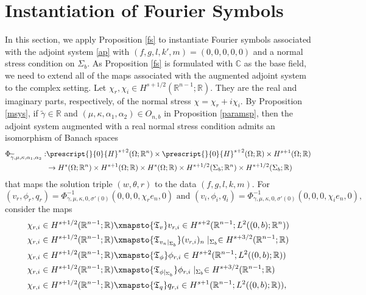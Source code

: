 \documentclass[11pt,letterpaper,reqno]{amsart}
\numberwithin{equation}{section}
\begin{document}
\section{Instantiation of Fourier Symbols} \label{instfs}
In this section, we apply Proposition \ref{fs} to instantiate Fourier symbols associated with the adjoint system \eqref{ap} with \((f,g,l,k',m)=(0,0,0,0,0)\) and a normal stress condition on \(\Sigma_{b}\). As Proposition \ref{fs} is formulated with \(\mathbb{C}\) as the base field, we need to extend all of the maps associated with the augmented adjoint system to the complex setting. Let \(\chi_{r},\chi_{i} \in H^{s+1/2}(\mathbb{R}^{n-1};\mathbb{R})\). They are the real and imaginary parts, respectively, of the normal stress \(\chi=\chi_{r}+i\chi_{i}\). By Proposition \ref{msys}, if \(\widetilde{\gamma} \in \mathbb{R}\) and \((\mu, \kappa,\alpha_{1},\alpha_{2}) \in O_{n,b}\) in Proposition \ref{paramsp}, then the adjoint system augmented with a real normal stress condition admits an isomorphism of Banach spaces
\begin{align}
    \Phi_{\widetilde{\gamma},\mu,\kappa,\alpha_{1},\alpha_{2}}:&\prescript{}{0}{H}^{s+2}(\Omega;\mathbb{R}^{n}) \times \prescript{}{0}{H}^{s+2}(\Omega;\mathbb{R}) \times H^{s+1}(\Omega;\mathbb{R}) \nonumber\\
    &\to H^{s}(\Omega;\mathbb{R}^{n}) \times H^{s+1}(\Omega;\mathbb{R}) \times H^{s}(\Omega;\mathbb{R}) \times H^{s+1/2}(\Sigma_{b};\mathbb{R}^{n}) \times H^{s+1/2}(\Sigma_{b};\mathbb{R})
\end{align}
that maps the solution triple \((w,\theta,r)\) to the data \((f,g,l,k,m)\). For
\begin{equation}
    (v_{r},\phi_{r},q_{r}) = \Phi^{-1}_{\gamma,\mu,\kappa,0,\sigma'(0)}(0,0,0,\chi_{r}e_{n},0) \text{ and }
    (v_{i},\phi_{i},q_{i}) =\Phi^{-1}_{\gamma,\mu,\kappa,0,\sigma'(0)}(0,0,0,\chi_{i}e_{n},0),
\end{equation}
consider the maps
\begin{align}
    &\chi_{r,i} \in H^{s+1/2}(\mathbb{R}^{n-1};\mathbb{R}) \xmapsto{\mathfrak{T}_{v}} v_{r,i} \in H^{s+2}(\mathbb{R}^{n-1}; L^{2}((0,b);\mathbb{R}^{n})) \label{rvmap} \\
    &\chi_{r,i} \in H^{s+1/2}(\mathbb{R}^{n-1};\mathbb{R}) \xmapsto{\mathfrak{T}_{v_{n}\mid_{\Sigma_{b}}}} (v_{r,i})_{n} \mid_{\Sigma_{b}} \in H^{s+3/2}(\mathbb{R}^{n-1}; \mathbb{R}) \\
    &\chi_{r,i} \in H^{s+1/2}(\mathbb{R}^{n-1};\mathbb{R}) \xmapsto{\mathfrak{T}_{\phi}} \phi_{r,i} \in H^{s+2}(\mathbb{R}^{n-1}; L^{2}((0,b);\mathbb{R})) \\
    &\chi_{r,i} \in H^{s+1/2}(\mathbb{R}^{n-1};\mathbb{R}) \xmapsto{\mathfrak{T}_{\phi\mid_{\Sigma_{b}}}} \phi_{r,i}\mid_{\Sigma_{b}} \in H^{s+3/2}(\mathbb{R}^{n-1}; \mathbb{R}) \\
    &\chi_{r,i} \in H^{s+1/2}(\mathbb{R}^{n-1};\mathbb{R}) \xmapsto{\mathfrak{T}_{q}} q_{r,i} \in H^{s+1}(\mathbb{R}^{n-1}; L^{2}((0,b);\mathbb{R})), \label{rqmap}
\end{align}
\end{document}
